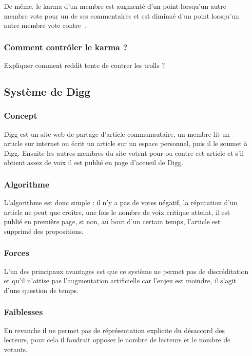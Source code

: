 \documentclass[a4paper, 11pt]{article} %
\begin{document}
De même, le karma d'un membre est augmenté d'un point lorsqu'un autre membre vote pour un de ses commentaires et est diminué d'un point lorsqu'un autre membre vote contre~\cite{RedditTroll}.

\subsubsection{Comment contrôler le karma ?}
Expliquer comment reddit tente de contrer les trolls ?


\subsection{Système de Digg}
\subsubsection{Concept}
Digg est un site web de partage d'article communautaire, un membre lit un article sur internet ou écrit un article sur un espace personnel, puis il le soumet à Digg.
Ensuite les autres membres du site votent pour ou contre cet article et s'il obtient assez de voix il est publié en page d'accueil de Digg.

\subsubsection{Algorithme}
L'algorithme est donc simple : il n'y a pas de votes négatif, la réputation d'un article ne peut que croître, une fois le nombre de voix critique atteint, il est publié en première page, si non, au bout d'un certain temps, l'article est supprimé des propositions.

\subsubsection{Forces}
L'un des principaux avantages est que ce système ne permet pas de discréditation et qu'il n'attise pas l'augmentation artificielle car l'enjeu est moindre, il s'agit d'une question de temps.

\subsubsection{Faiblesses}
En revanche il ne permet pas de réprésentation explicite du désaccord des lecteurs, pour cela il faudrait opposer le nombre de lecteurs et le nombre de votants.






\end{document}
